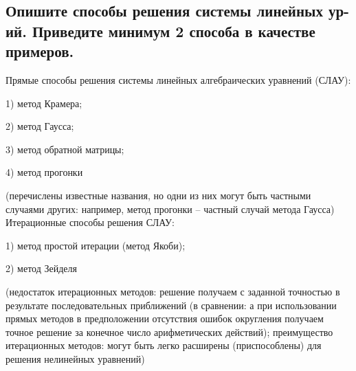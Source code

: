 

\subsection{Опишите способы решения системы линейных ур-ий. Приведите минимум 2 способа в качестве примеров.}

Прямые способы решения системы линейных алгебраических уравнений (СЛАУ):

1) метод Крамера;

2) метод Гаусса;

3) метод обратной матрицы;

4) метод прогонки

(перечислены известные названия, но одни из них могут быть частными случаями других: например, метод прогонки -- частный случай метода Гаусса)
\\

Итерационные способы решения СЛАУ:

1) метод простой итерации (метод Якоби);

2) метод Зейделя

(недостаток итерационных методов: решение получаем с заданной точностью в результате последовательных приближений (в сравнении: а при использовании прямых методов в предположении отсутствия ошибок округления получаем точное решение за конечное число арифметических действий); преимущество итерационных методов: могут быть легко расширены (приспособлены) для решения нелинейных уравнений)

